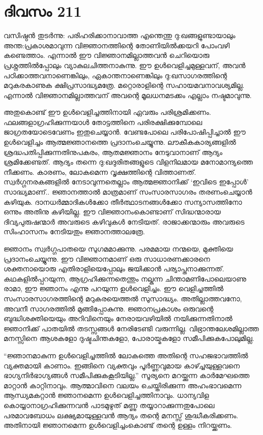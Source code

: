 \section{ദിവസം 211}


വസിഷ്ഠൻ തുടർന്നു: പരിഹരിക്കാനാവാത്ത എന്തെന്തു ദു:ഖങ്ങളുണ്ടായാലും അന്ത:പ്രകാശമാവുന്ന വിജ്ഞാനത്തിന്റെ തോണിയില്‍ക്കയറി പോംവഴി കണ്ടെത്താം. എന്നാൽ ഈ വിജ്ഞാനമില്ലാത്തവൻ ചെറിയൊരു പ്രശ്നത്തിൽപ്പോലും വ്യാകുലചിത്തനാകുന്നു. ഈ ഉൾവെളിച്ചമുള്ളവന്‌, അവന്‍ പഠിക്കാത്തവനാണെങ്കിലും, ഏകാന്തനാണെങ്കിലും ദു:ഖസാഗരത്തിന്റെ മറുകരകാണുക ക്ഷിപ്രസാദ്ധ്യമത്രേ. മറ്റൊരാളിന്റെ സഹായമവനാവശ്യമില്ല. എന്നാൽ വിജ്ഞാനമില്ലാത്തവന്‌ അവന്റെ മൂലധനമടക്കം എല്ലാം നഷ്ടമാവുന്നു.

അതുകൊണ്ട് ഈ ഉൾവെളിച്ചത്തിനായി ഏവരും പരിശ്രമിക്കണം. ഫലങ്ങളാഗ്രഹിക്കുന്നയാൾ തോട്ടത്തിനെ പരിരക്ഷിക്കുമ്പോലെ ജാഗ്രതയോടെവേണം ഇതുചെയ്യാൻ. വേണ്ടപോലെ പരിപോഷിപ്പിച്ചാൽ ഈ ഉൾവെളിച്ചം ആത്മജ്ഞാനത്തെ പ്രദാനംചെയ്യുന്നു. ലൗകീകകാര്യങ്ങളിൽ ശ്രദ്ധപതിപ്പിക്കുന്നതിനുപകരം, ആതമജ്ഞാനം നേടുവാനാണ്‌ ആദ്യം ശ്രമിക്കേണ്ടത്. ആദ്യം തന്നെ ദു:ഖദുരിതങ്ങളുടെ വിളനിലമായ മനോമാന്ദ്യത്തെ നീക്കണം. കാരണം, ലോകമെന്ന  വൃക്ഷത്തിന്റെ വിത്താണത്. സ്വർഗ്ഗനരകങ്ങളിൽ നേടാവുന്നതെല്ലാം ആത്മജ്ഞാനിക്ക് ‘ഇവിടെ ഇപ്പോൾ’ സാദ്ധ്യമാണ്‌.. ജ്ഞാനത്താല്‍  മാത്രമാണ് സംസാരസാഗരം തരണംചെയ്യാൻ കഴിയുക. ദാനധർമ്മാദികൾക്കോ തീർത്ഥാടനങ്ങൾക്കോ സന്യാസത്തിനോ ഒന്നും അതിനു കഴിയില്ല. ഈ വിജ്ഞാനംകൊണ്ടാണ്‌ സിദ്ധന്മാരായ ദിവ്യപുരുഷന്മാർ അവരുടെ കഴിവുകൾ നേടിയത്. രാജാക്കന്മാരും അവരുടെ സിംഹാസനം നേടിയതും ജ്ഞാനത്താലത്രേ.

ജ്ഞാനം സ്വർഗ്ഗപാതയെ സുഗമമാക്കുന്നു. പരമമായ നന്മയെ, മുക്തിയെ പ്രദാനംചെയ്യുന്നു. ഈ വിജ്ഞാനമാണ്‌ ഒരു സാധാരണക്കാരനെ ശക്തനായൊരു എതിരാളിയെപ്പോലും ജയിക്കാൻ പര്യാപ്തനാക്കുന്നത്. കഥകളില്‍പ്പറയുന്ന, ആഗ്രഹിക്കുന്നതെന്തും നല്കുന്ന ചിന്താമണിപോലെയാണു രാമാ, ഈ ജ്ഞാനം എന്നു പറയുന്ന ഉൾവെളിച്ചം. ഈ വെളിച്ചത്തിൽ സംസാരസാഗരത്തിന്റെ മറുകരയെത്തൽ സുസാദ്ധ്യം. അതില്ലാത്തവനോ, അവനീ സാഗരത്തിൽ മുങ്ങിപ്പോകുന്നു. ജ്ഞാനപ്രകാശം ഒരുവന്റെ ബുദ്ധിശക്തിയെയും അറിവിനെയും നേരായവഴിയിൽ നയിക്കുന്നതിനാൽ ജ്ഞാനിക്ക് പാതയിൽ തടസ്സങ്ങൾ നേരിടേണ്ടി വരുന്നില്ല. വിഭ്രാന്തലേശമില്ലാത്ത മനസ്സിനെ ആശകളോ ദുഷ്ടചിന്തകളോ, പോരായ്മകളോ സമീപിക്കുകപോലുമില്ല.

“ജ്ഞാനമാകുന്ന ഉൾവെളിച്ചത്തിൽ ലോകത്തെ അതിന്റെ സഹജഭാവത്തിൽ വ്യക്തമായി കാണാം. ഇങ്ങിനെ വ്യക്തവും പൂർണ്ണവുമായ കാഴ്ച്ചയുള്ളവനെ ഭാഗ്യനിർഭാഗ്യങ്ങൾ സമീപിക്കുകകൂടിയില്ല.” സൂര്യനെ മറയ്ക്കുന്ന കാർമേഘത്തെ മാറ്റാൻ കാറ്റിനാവും. ആത്മാവിനെ വലയം ചെയ്തിരിക്കുന്ന അഹംഭാവമെന്ന ആന്ധ്യമകറ്റാൻ ജ്ഞാനമെന്ന ഉൾവെളിച്ചത്തിനാവും. ധാന്യവിള കൊയ്യാനാഗ്രഹിക്കുന്നവൻ പാടമുഴുത് മണ്ണു തയ്യാറാക്കുന്നതുപോലെ പരമാവബോധം ലക്ഷ്യമായുള്ളവൻ ആദ്യം തന്റെ മനസ്സ് ശുദ്ധീകരിക്കണം. അതിനായി ജ്ഞാനമെന്ന ഉൾവെളിച്ചംകൊണ്ട് തന്റെ ഉള്ളം നിറയ്ക്കണം. 
